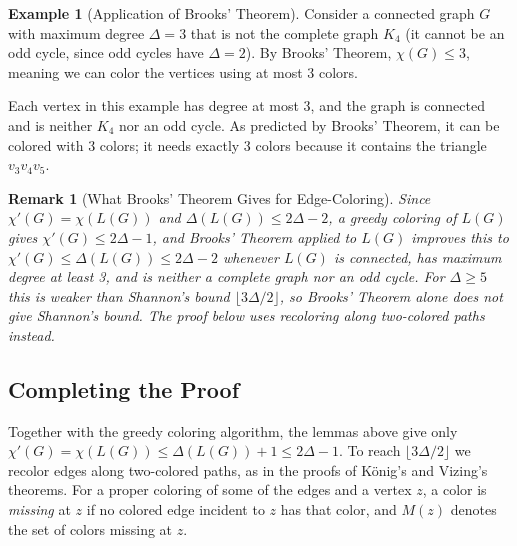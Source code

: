 \documentclass{article}
\newtheorem{remark}{Remark}
\theoremstyle{definition}
\newtheorem{example}{Example}
\begin{document}
\begin{example}[Application of Brooks' Theorem]
Consider a connected graph $G$ with maximum degree $\Delta = 3$ that is not the complete graph $K_4$ (it cannot be an odd cycle, since odd cycles have $\Delta = 2$). By Brooks' Theorem, $\chi(G) \leq 3$, meaning we can color the vertices using at most 3 colors.

\begin{center}
\noindent\begin{minipage}{\linewidth}\centering
{}
\label{fig:brooks-example}
\end{minipage}
\end{center}

Each vertex in this example has degree at most 3, and the graph is connected and is neither $K_4$ nor an odd cycle. As predicted by Brooks' Theorem, it can be colored with 3 colors; it needs exactly 3 colors because it contains the triangle $v_3 v_4 v_5$.
\end{example}

\begin{remark}[What Brooks' Theorem Gives for Edge-Coloring]
Since $\chi'(G) = \chi(L(G))$ and $\Delta(L(G)) \leq 2\Delta - 2$, a greedy coloring of $L(G)$ gives $\chi'(G) \leq 2\Delta - 1$, and Brooks' Theorem applied to $L(G)$ improves this to $\chi'(G) \leq \Delta(L(G)) \leq 2\Delta - 2$ whenever $L(G)$ is connected, has maximum degree at least 3, and is neither a complete graph nor an odd cycle. For $\Delta \geq 5$ this is weaker than Shannon's bound $\lfloor 3\Delta/2 \rfloor$, so Brooks' Theorem alone does not give Shannon's bound. The proof below uses recoloring along two-colored paths instead.
\end{remark}

\subsection*{Completing the Proof}
Together with the greedy coloring algorithm, the lemmas above give only $\chi'(G) = \chi(L(G)) \leq \Delta(L(G)) + 1 \leq 2\Delta - 1$. To reach $\lfloor 3\Delta/2 \rfloor$ we recolor edges along two-colored paths, as in the proofs of König's and Vizing's theorems. For a proper coloring of some of the edges and a vertex $z$, a color is \emph{missing} at $z$ if no colored edge incident to $z$ has that color, and $M(z)$ denotes the set of colors missing at $z$.
\end{document}
